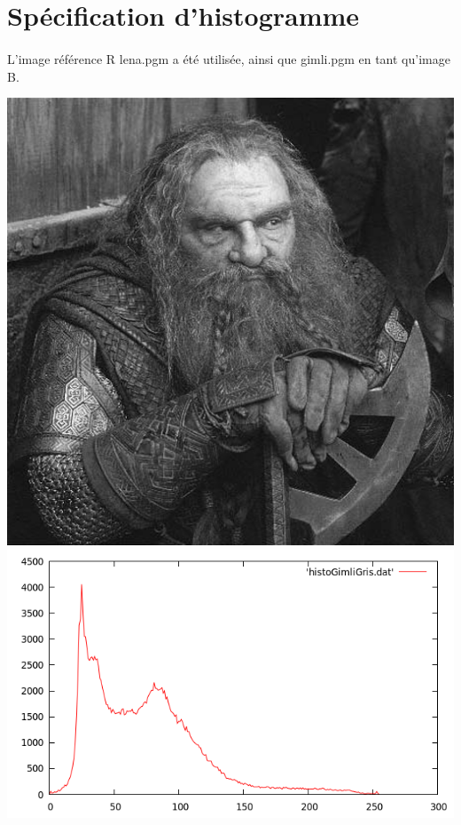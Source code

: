 \documentclass[a4paper,11pt]{article}
\begin{document}
\newpage
\section{Spécification d'histogramme}
\paragraph{} L'image référence R lena.pgm a été utilisée, ainsi que gimli.pgm en tant qu'image B.
\begin{center}
\includegraphics[scale=0.25]{gimliA.png}
\includegraphics[scale=0.25]{histoGimliGris.png}\\

\end{center}
\end{document}
